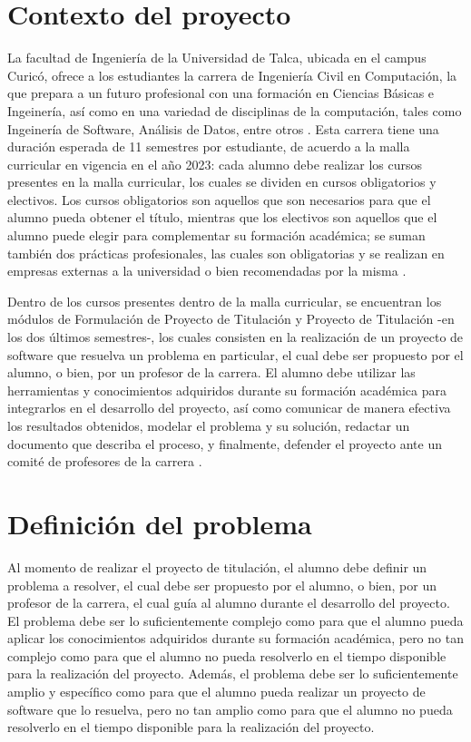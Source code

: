 \section{Contexto del proyecto}
La facultad de Ingeniería de la Universidad de Talca, ubicada en el campus Curicó, ofrece a los estudiantes la carrera de Ingeniería Civil en Computación, la que prepara a un futuro profesional con una formación en Ciencias Básicas e Ingeinería, así como en una variedad de disciplinas de la computación, tales como Ingeinería de Software, Análisis de Datos, entre otros \cite{icc}.
Esta carrera tiene una duración esperada de 11 semestres por estudiante, de acuerdo a la malla curricular en vigencia en el año 2023: cada alumno debe realizar los cursos presentes en la malla curricular, los cuales se dividen en cursos obligatorios y electivos. Los cursos obligatorios son aquellos que son necesarios para que el alumno pueda obtener el título, mientras que los electivos son aquellos que el alumno puede elegir para complementar su formación académica; se suman también dos prácticas profesionales, las cuales son obligatorias y se realizan en empresas externas a la universidad o bien recomendadas por la misma \cite{icc2019}.

Dentro de los cursos presentes dentro de la malla curricular, se encuentran los módulos de Formulación de Proyecto de Titulación y Proyecto de Titulación -en los dos últimos semestres-, los cuales consisten en la realización de un proyecto de software que resuelva un problema en particular, el cual debe ser propuesto por el alumno, o bien, por un profesor de la carrera.
El alumno debe utilizar las herramientas y conocimientos adquiridos durante su formación académica para integrarlos en el desarrollo del proyecto, así como comunicar de manera efectiva los resultados obtenidos, modelar el problema y su solución, redactar un documento que describa el proceso, y finalmente, defender el proyecto ante un comité de profesores de la carrera \cite{fpt2019, pt2019}.

\section{Definición del problema}
Al momento de realizar el proyecto de titulación, el alumno debe definir un problema a resolver, el cual debe ser propuesto por el alumno, o bien, por un profesor de la carrera, el cual guía al alumno durante el desarrollo del proyecto.
El problema debe ser lo suficientemente complejo como para que el alumno pueda aplicar los conocimientos adquiridos durante su formación académica, pero no tan complejo como para que el alumno no pueda resolverlo en el tiempo disponible para la realización del proyecto.
Además, el problema debe ser lo suficientemente amplio y específico como para que el alumno pueda realizar un proyecto de software que lo resuelva, pero no tan amplio como para que el alumno no pueda resolverlo en el tiempo disponible para la realización del proyecto.

